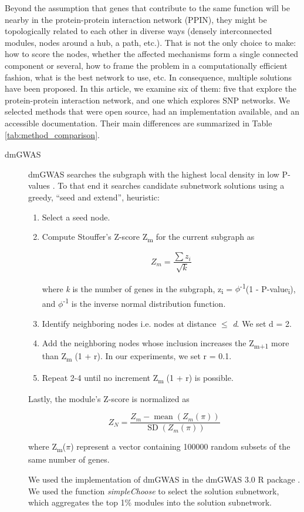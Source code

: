 \documentclass[twocolumn, 10pt]{article}
\begin{document}
Beyond the assumption that genes that contribute to the same function will be nearby in the protein-protein interaction network (PPIN), they might be topologically related to each other in diverse ways (densely interconnected modules, nodes around a hub, a path, etc.). That is not the only choice to make: how to score the nodes, whether the affected mechanisms form a single connected component or several, how to frame the problem in a computationally efficient fashion, what is the best network to use, etc. In consequence, multiple solutions have been proposed. In this article, we examine six of them: five that explore the protein-protein interaction network, and one which explores SNP networks. We selected methods that were open source, had an implementation available, and an accessible documentation. Their main differences are summarized in Table \ref{tab:method_comparison}.

\begin{description}
\item[{dmGWAS}] dmGWAS searches the subgraph with the highest local density in low P-values \cite{jia_dmgwas:_2011}. To that end it searches candidate subnetwork solutions using a greedy, ``seed and extend'', heuristic:

\begin{enumerate}
\item Select a seed node.
\item Compute Stouffer's Z-score Z\textsubscript{m} for the current subgraph as

\begin{equation*} 
Z_m = \frac{\sum z_i}{\sqrt{k}}
\end{equation*}

where \emph{k} is the number of genes in the subgraph, z\textsubscript{i} = \(\phi\)\textsuperscript{-1}(1 - P-value\textsubscript{i}), and \(\phi\)\textsuperscript{-1} is the inverse normal distribution function.
\item Identify neighboring nodes i.e. nodes at distance \(\le\) \emph{d}. We set d = 2.
\item Add the neighboring nodes whose inclusion increases the Z\textsubscript{m+1} more than Z\textsubscript{m} \texttimes{} (1 + r). In our experiments, we set r = 0.1.
\item Repeat 2-4 until no increment Z\textsubscript{m} \texttimes{} (1 + r) is possible.
\end{enumerate}

Lastly, the module's Z-score is normalized as

\begin{equation*}
Z_{N}=\frac{Z_{m}-\operatorname{mean}\left(Z_{m}(\pi)\right)}{\operatorname{SD}\left(Z_{m}(\pi)\right)}
\end{equation*} 

where Z\textsubscript{m}(\(\pi\)) represent a vector containing 100000 random subsets of the same number of genes.

We used the implementation of dmGWAS in the dmGWAS 3.0 R package \cite{dmgwas}. We used the function \emph{simpleChoose} to select the solution subnetwork, which aggregates the top 1\% modules into the solution subnetwork.
\end{description}
\end{document}
